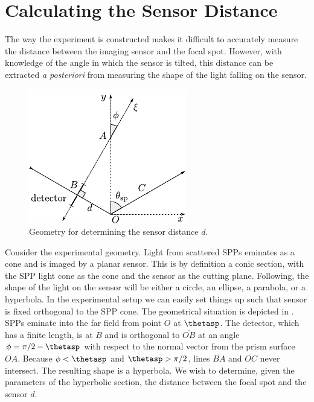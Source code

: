 \section{Calculating the Sensor Distance}
The way the experiment is constructed makes it difficult to accurately
measure the distance between the imaging sensor and the focal spot.
However, with knowledge of the angle in which the sensor is tilted, this
distance can be extracted \textit{a posteriori} from measuring the shape
of the light falling on the sensor.
\begin{figure}
\centering
\includegraphics[keepaspectratio,scale=1.25]{figures/hyperbolageoa.pdf}
\caption{Geometry for determining the sensor distance $d$.}
\label{fig:propgeo}
\end{figure}

Consider the experimental geometry.  Light from scattered SPPs eminates as
a cone and is imaged by a planar sensor.  This is by definition a conic
section, with the SPP light cone as the cone and the sensor as the cutting
plane.  Following, the shape of the light on the sensor will be either a
circle, an ellipse, a parabola, or a hyperbola.  In the experimental setup
we can easily set things up such that sensor is fixed
orthogonal to the SPP cone.  The geometrical situation is depicted in
.  SPPs eminate into the far field from point $O$ at
$\thetasp$.  The detector, which has a finite length, is at $B$ and is
orthogonal to $\overline{OB}$ at an angle $\phi=\pi/2-\thetasp$ with respect to
the normal vector from the prism surface $\overline{OA}$.  Because
$\phi<\thetasp$ and $\thetasp>\pi/2$, lines $\overline{BA}$ and $\overline{OC}$ never
intersect. The resulting shape is a hyperbola.  We wish to determine, given
the parameters of the hyperbolic section, the distance between the focal
spot and the sensor $d$.  

